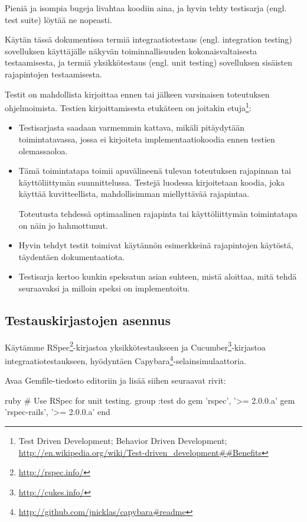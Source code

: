 \documentclass{article}
\newcommand{\pdfforeignlanguage}[2]{\texorpdfstring{\foreignlanguage{#1}{#2}}{#2}}
\newcommand{\eng}[1]{\pdfforeignlanguage{english}{#1}}
\begin{document}
Pieniä ja isompia bugeja livahtaa koodiin aina, ja hyvin tehty testisarja
(engl. \eng{test suite}) löytää ne nopeasti.

Käytän tässä dokumentissa termiä integraatiotestaus (engl. \eng{integration
testing}) sovelluksen käyttäjälle näkyvän toiminnallisuuden kokonaisvaltaisesta
testaamisesta, ja termiä yksikkötestaus (engl. \eng{unit testing}) sovelluksen
sisäisten rajapintojen testaamisesta.

Testit on mahdollista kirjoittaa ennen tai jälkeen varsinaisen toteutuksen
ohjelmoimista. Testien kirjoittamisesta etukäteen on joitakin
etuja\footnote{\eng{Test Driven Development; Behavior Driven Development;
\url{http://en.wikipedia.org/wiki/Test-driven\_development##Benefits}}}:

\begin{itemize}
\item
Testisarjasta saadaan varmemmin kattava, mikäli pitäydytään toimintatavassa,
jossa ei kirjoiteta implementaatiokoodia ennen testien olemassaoloa.

\item
Tämä toimintatapa toimii apuvälineenä tulevan toteutuksen rajapinnan tai
käyttöliittymän suunnittelussa. Testejä luodessa kirjoitetaan koodia, joka
käyttää kuvitteellista, mahdollisimman miellyttävää rajapintaa.

Toteutusta tehdessä optimaalinen rajapinta tai käyttöliittymän toimintatapa on
näin jo hahmottunut.

\item
Hyvin tehdyt testit toimivat käytännön esimerkkeinä rajapintojen käytöstä,
täydentäen dokumentaatiota.

\item
Testisarja kertoo kunkin speksatun asian suhteen, mistä aloittaa, mitä tehdä
seuraavaksi ja milloin speksi on implementoitu.
\end{itemize}

\subsection{Testauskirjastojen asennus}

Käytämme RSpec\footnote{\url{http://rspec.info/}}-kirjastoa yksikkötestaukseen
ja Cucumber\footnote{\url{http://cukes.info/}}-kirjastoa
integraatiotestaukseen, hyödyntäen
Capybara\footnote{\url{http://github.com/jnicklas/capybara\#readme}}-selainsimulaattoria.

\begin{samepage}
Avaa Gemfile-tiedosto editoriin ja lisää siihen seuraavat rivit:

\begin{pygmented}{ruby}
# Use RSpec for unit testing.
group :test do
  gem 'rspec', '>= 2.0.0.a'
  gem 'rspec-rails', '>= 2.0.0.a'
end
\end{pygmented}
\end{samepage}
\end{document}
